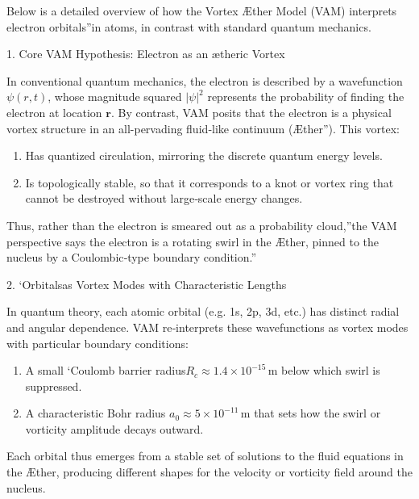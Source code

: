 Below is a detailed overview of how the Vortex Æther Model (VAM) interprets electron \grqq orbitals\textquotedblright in atoms, in contrast with standard quantum mechanics.





1. Core VAM Hypothesis: Electron as an ætheric Vortex

In conventional quantum mechanics, the electron is described by a wavefunction \(\psi(r,t)\), whose magnitude squared \(|\psi|^2\) represents the probability of finding the electron at location \(\mathbf{r}\). By contrast, VAM posits that the electron is a physical vortex structure in an all-pervading fluid‐like continuum (\grqq Æther\textquotedblright). This vortex:

\begin{enumerate}
\item Has quantized circulation, mirroring the discrete quantum energy levels.
\item Is topologically stable, so that it corresponds to a knot or vortex ring that cannot be destroyed without large‐scale energy changes.
\end{enumerate}
Thus, rather than \grqq the electron is smeared out as a probability cloud,\textquotedblright the VAM perspective says \grqq the electron is a rotating swirl in the Æther, pinned to the nucleus by a Coulombic‐type boundary condition.\textquotedblright


2. ‘Orbitals\rqs  as Vortex Modes with Characteristic Lengths

In quantum theory, each atomic orbital (e.g. 1s, 2p, 3d, etc.) has distinct radial and angular dependence. VAM re‐interprets these wavefunctions as vortex modes with particular boundary conditions:

\begin{enumerate}
\item A small ‘Coulomb barrier radius\rqs  \(R_c \approx 1.4 \times 10^{-15}\,\mathrm{m}\) below which swirl is suppressed.
\item A characteristic Bohr radius \(a_0 \approx 5 \times 10^{-11}\,\mathrm{m}\) that sets how the swirl or vorticity amplitude decays outward.
\end{enumerate}
Each orbital thus emerges from a stable set of solutions to the fluid equations in the Æther, producing different shapes for the velocity or vorticity field around the nucleus.





